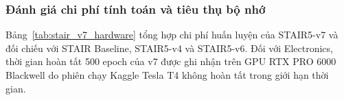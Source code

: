 
\subsubsection{Đánh giá chi phí tính toán và tiêu thụ bộ nhớ}

Bảng~\ref{tab:stair_v7_hardware} tổng hợp chi phí huấn luyện của STAIR5-v7 và đối chiếu với STAIR Baseline, STAIR5-v4 và STAIR5-v6. Đối với Electronics, thời gian hoàn tất 500 epoch của v7 được ghi nhận trên GPU RTX PRO 6000 Blackwell do phiên chạy Kaggle Tesla T4 không hoàn tất trong giới hạn thời gian.

\begin{table}[!htbp]
    \centering
    \caption{So sánh thời gian huấn luyện và bộ nhớ GPU của STAIR Baseline, STAIR5-v4, STAIR5-v6 và STAIR5-v7.}
    \label{tab:stair_v7_hardware}
    \scriptsize
    \renewcommand{\arraystretch}{1.15}
    \setlength{\tabcolsep}{4pt}

\end{table}
